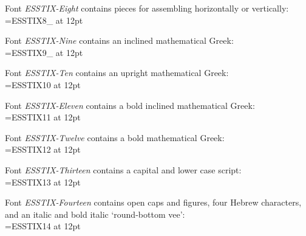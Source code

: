 \documentclass[11pt]{amsart}
\begin{document}
Font  \emph{ESSTIX-Eight} contains pieces for assembling horizontally or vertically:\\[3pt]\font\ess=ESSTIX8_ at 12pt
{\ess{}}\newline
{\ess{}}

Font  \emph{ESSTIX-Nine} contains an inclined mathematical Greek:\\[3pt]
\font\ess=ESSTIX9_ at 12pt
{\ess{}}\newline
{\ess{}}
{\ess{}}

Font  \emph{ESSTIX-Ten} contains an upright mathematical Greek:\\[3pt]\font\ess=ESSTIX10 at 12pt
{\ess{}}\newline
{\ess{}}
{\ess{}}

Font  \emph{ESSTIX-Eleven} contains  a bold inclined mathematical Greek:\\[3pt]
\font\ess=ESSTIX11 at 12pt
{\ess{}}\newline
{\ess{}}
{\ess{}}

Font  \emph{ESSTIX-Twelve} contains  a bold mathematical Greek:\\[3pt]
\font\ess=ESSTIX12 at 12pt
{\ess{}}\newline
{\ess{}}
{\ess{}}

Font  \emph{ESSTIX-Thirteen} contains a capital and lower case script:\\[3pt]
\font\ess=ESSTIX13 at 12pt
{\ess{}}\newline
{\ess{}}

Font  \emph{ESSTIX-Fourteen} contains open caps and figures, four Hebrew characters, and an italic and bold italic `round-bottom vee':\\[3pt]\font\ess=ESSTIX14 at 12pt
{\ess{}}\newline
{\ess{}}\newline
{\ess{}}
\end{document}
